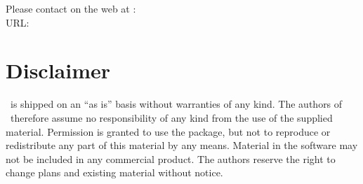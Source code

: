 Please contact on the web at :\\
URL: \MolcasWWW\\

\section{Disclaimer}
\label{sec:disclaimer}

\molcas\ is shipped on an ``as is'' basis without warranties of any kind.
The authors of \molcasviii\ therefore assume no responsibility of any kind from 
the use of the supplied material. Permission is granted to use the 
package, but not to reproduce or redistribute any part of this material by
any means. Material in the software may 
not be included in any commercial product. The authors reserve the right to 
change plans and existing material without notice.

